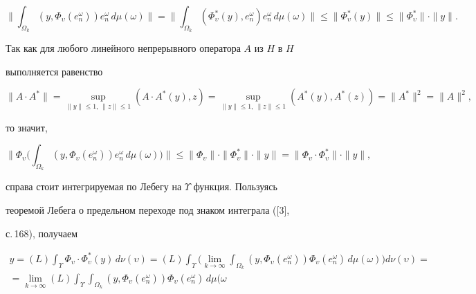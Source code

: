 \begin{pf}
$$


\bigg\|\int_{\Omega_k} (y, \Phi_\upsilon (e^\omega_n))e^\omega_n\,


d\mu(\omega)\bigg\|=\bigg\|\int_{\Omega_k}(\Phi^*_\upsilon


(y),e^\omega_n)e^\omega_n\,d\mu(\omega)\bigg\|\leqslant\|


\Phi^*_\upsilon(y)\|\leqslant \|\Phi^*_\upsilon\| \cdot \|y\|.


$$


Так как для любого линейного непрерывного оператора $A$ из $H$ в $H$


выполняется равенство


$$


\|A\cdot A^*\|=\sup_{\|y\|\leqslant 1,\ \|z\|\leqslant 1}


(A\cdot A^*(y),z)=\sup_{\|y\|\leqslant 1,\ \|z\|\leqslant


1} (A^*(y),A^* (z))=\|A^*\|^2=\|A\|^2,


$$


то значит,


$$


\bigg\|\Phi_\upsilon\bigg(\int_{\Omega_k}(y,\Phi_\upsilon


(e^\omega_n))e^\omega_n\,d\mu(\omega)\bigg)\bigg\|\leqslant\|


\Phi_\upsilon\|\cdot\|\Phi^*_\upsilon\|\cdot\|y\|=\|\Phi_\upsilon


\cdot\Phi^*_\upsilon\|\cdot\|y\|,


$$


справа стоит интегрируемая по Лебегу на $\Upsilon$ функция. Пользуясь


теоремой Лебега о предельном переходе под знаком интеграла ([3],


с.\,168), получаем


\begin{gather*}


y=(L)\int_\Upsilon \Phi_\upsilon\cdot\Phi^*_\upsilon (y)\,


d\nu(\upsilon)=(L)\int_\Upsilon \bigg(\lim_{k\to\infty} \int


_{\Omega_k}(y,\Phi_\upsilon(e^\omega_n))\Phi_\upsilon


(e^\omega_n)\,d\mu(\omega)\bigg)d\nu(\upsilon)= \\


%


=\lim_{k\to\infty}(L)\int_\Upsilon \int_{\Omega_k}


(y,\Phi_\upsilon (e^\omega_n))\Phi_\upsilon(e^\omega_n)\,d\mu(\omega



\end{gather*}
\end{pf}
